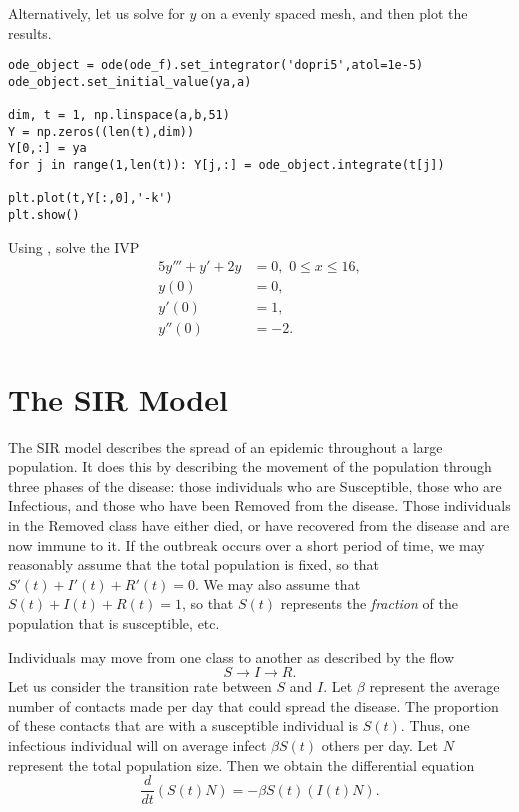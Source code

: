 Alternatively, let us solve for $y$ on a evenly spaced mesh, and then plot the results.
\begin{lstlisting}
ode_object = ode(ode_f).set_integrator('dopri5',atol=1e-5) 
ode_object.set_initial_value(ya,a) 

dim, t = 1, np.linspace(a,b,51)
Y = np.zeros((len(t),dim))
Y[0,:] = ya
for j in range(1,len(t)): Y[j,:] = ode_object.integrate(t[j])  

plt.plot(t,Y[:,0],'-k')
plt.show()
\end{lstlisting}


\begin{problem}
Using , solve the IVP
\begin{align*}
5y''' + y'+2y &= 0, \,\, 0 \leq x \leq 16,\\
y(0) &=0,\\
y'(0) &= 1,\\
y''(0) &= -2.
\end{align*}
\end{problem}




\section*{The SIR Model}
The SIR model describes the spread of an epidemic throughout a large population. It does this by describing the movement of the population through three phases of the disease: those individuals who are Susceptible, those who are Infectious, and those who have been Removed from the disease. Those individuals in the Removed class have either died, or have recovered from the disease and are now immune to it. If the outbreak occurs over a short period of time, we may reasonably assume that the total population is fixed, so that $S'(t) + I'(t) + R'(t) = 0$.  We may also assume that $S(t) + I(t) + R(t) = 1$, so that $S(t)$ represents the \textit{fraction} of the population that is susceptible, etc. 

Individuals may move from one class to another as described by the flow 
\[S \to I \to R.\] Let us consider the transition rate between $S$ and $I $. Let $\beta$ represent the average number of contacts made per day that could spread the disease. The proportion of these contacts that are with a susceptible individual is $S(t)$. Thus, one infectious individual will on average infect $\beta S(t)$ others per day. Let $N$ represent the total population size. Then we obtain the differential equation
 \[\frac{d}{dt}(S(t) N) = -\beta S(t) (I(t) N).\]
 
